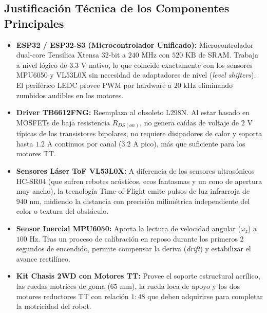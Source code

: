 \documentclass[11pt,a4paper]{article}
\begin{document}
\subsection{Justificación Técnica de los Componentes Principales}
\begin{itemize}
    \item \textbf{ESP32 / ESP32-S3 (Microcontrolador Unificado):} Microcontrolador dual-core Tensilica Xtensa 32-bit a $240\text{ MHz}$ con $520\text{ KB}$ de SRAM. Trabaja a nivel lógico de $3.3\text{ V}$ nativo, lo que coincide exactamente con los sensores MPU6050 y VL53L0X sin necesidad de adaptadores de nivel (\textit{level shifters}). El periférico LEDC provee PWM por hardware a $20\text{ kHz}$ eliminando zumbidos audibles en los motores.
    \item \textbf{Driver TB6612FNG:} Reemplaza al obsoleto L298N. Al estar basado en MOSFETs de baja resistencia $R_{DS(on)}$, no genera caídas de voltaje de $2\text{ V}$ típicas de los transistores bipolares, no requiere disipadores de calor y soporta hasta $1.2\text{ A}$ continuos por canal ($3.2\text{ A}$ pico), más que suficiente para los motores TT.
    \item \textbf{Sensores Láser ToF VL53L0X:} A diferencia de los sensores ultrasónicos HC-SR04 (que sufren rebotes acústicos, ecos fantasmas y un cono de apertura muy ancho), la tecnología Time-of-Flight emite pulsos de luz infrarroja de $940\text{ nm}$, midiendo la distancia con precisión milimétrica independiente del color o textura del obstáculo.
    \item \textbf{Sensor Inercial MPU6050:} Aporta la lectura de velocidad angular ($\omega_z$) a $100\text{ Hz}$. Tras un proceso de calibración en reposo durante los primeros 2 segundos de encendido, permite compensar la deriva (\textit{drift}) y estabilizar el avance rectilíneo.
    \item \textbf{Kit Chasis 2WD con Motores TT:} Provee el soporte estructural acrílico, las ruedas motrices de goma ($65\text{ mm}$), la rueda loca de apoyo y los dos motores reductores TT con relación $1:48$ que deben adquirirse para completar la motricidad del robot.
\end{itemize}
\end{document}
